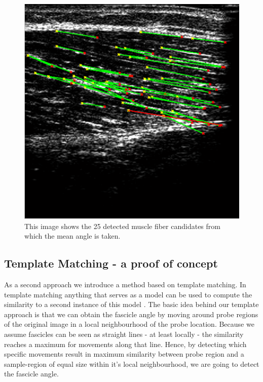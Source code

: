 \documentclass[10pt,twocolumn,letterpaper]{article}
\begin{document}
\begin{figure}
	\begin{center}		
		\includegraphics[width=1\linewidth]{img/im1_hough_fibers}
	\end{center}
	\caption{This image shows the 25 detected muscle fiber candidates from which the mean angle is taken.}
	\label{fig:im1_hough_fibers}
	
\end{figure}

\subsection{Template Matching - a proof of concept}
As a second approach we introduce a method based on template matching. In template matching anything that serves as a model can be used to compute the similarity to a second instance of this model \cite{Brunelli09a}. The basic idea behind our template approach is that we can obtain the fascicle angle by moving around probe regions of the original image in a local neighbourhood of the probe location. Because we assume fascicles can be seen as straight lines - at least locally - the similarity reaches a maximum for movements along that line. Hence, by detecting which specific movements result in maximum similarity between probe region and a sample-region of equal size within it's local neighbourhood, we are going to detect the fascicle angle.
\end{document}

